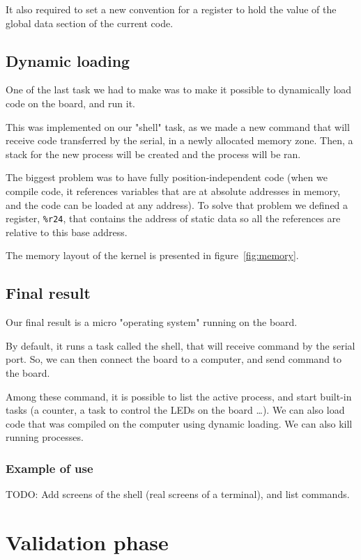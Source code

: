 \documentclass[openany, a4paper]{book}
\begin{document}
        It also required to set a new convention for a register to hold the
        value of the global data section of the current code.

    \section{Dynamic loading}
      One of the last task we had to make was to make it possible to
      dynamically load code on the board, and run it.

      This was implemented on our "shell" task, as we made a new command that
      will receive code transferred by the serial, in a newly allocated
      memory zone.  Then, a stack for the new process will be created and the
      process will be ran.

      The biggest problem was to have fully position-independent code (when
      we compile code, it references variables that are at absolute addresses
      in memory, and the code can be loaded at any address). To solve that
      problem we defined a register, \verb+%r24+, that contains the address of
      static data so all the references are relative to this base address.

      The memory layout of the kernel is presented in figure~\ref{fig:memory}.

    \section{Final result}
      Our final result is a micro "operating system" running on the board.

      By default, it runs a task called the shell, that will receive command by
      the serial port.  So, we can then connect the board to a computer, and
      send command to the board.

      Among these command, it is possible to list the active process, and start
      built-in tasks (a counter, a task to control the LEDs on the board \dots).
      We can also load code that was compiled on the computer using dynamic
      loading. We can also kill running processes.

      \subsection{Example of use}
        TODO: Add screens of the shell (real screens of a terminal), and list
        commands.

  \chapter{Validation phase}
\end{document}
